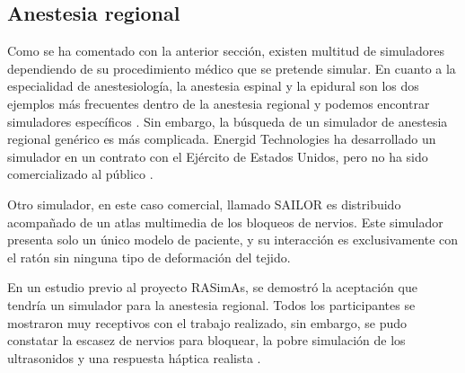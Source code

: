 

\subsection{Anestesia regional}

Como se ha comentado con la anterior sección, existen multitud de simuladores dependiendo de su procedimiento médico que se pretende simular. En cuanto a la especialidad de anestesiología, la anestesia espinal y la epidural son los dos ejemplos más frecuentes dentro de la anestesia regional y podemos encontrar simuladores específicos \cite{broom2018evaluation}. Sin embargo, la búsqueda de un simulador de anestesia regional genérico es más complicada. Energid Technologies ha desarrollado  un simulador en un contrato con el Ejército de Estados Unidos, pero no ha sido comercializado al público \cite{lim2008simulation}.

Otro simulador, en este caso comercial, llamado SAILOR es distribuido acompañado de un atlas multimedia de los bloqueos de nervios. Este simulador presenta solo un único modelo de paciente, y su interacción es exclusivamente con el ratón sin ninguna tipo de deformación del tejido. \cite{Bibin}

En un estudio previo al proyecto RASimAs, se demostró la aceptación que tendría un simulador para la anestesia regional. Todos los participantes se mostraron muy receptivos con el trabajo realizado, sin embargo, se pudo constatar la escasez de nervios para bloquear, la pobre simulación de los ultrasonidos y una respuesta háptica realista \cite{Grottke2009594}.

